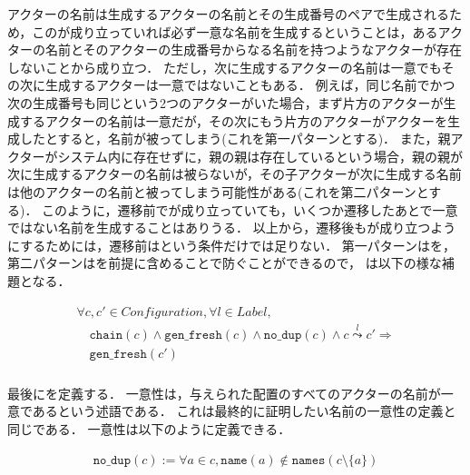 アクターの名前は生成するアクターの名前とその生成番号のペアで生成されるため，この\fresh が成り立っていれば必ず一意な名前を生成するということは，あるアクターの名前とそのアクターの生成番号からなる名前を持つようなアクターが存在しないことから成り立つ．
ただし，次に生成するアクターの名前は一意でもその次に生成するアクターは一意ではないこともある．
例えば，同じ名前でかつ次の生成番号も同じという2つのアクターがいた場合，まず片方のアクターが生成するアクターの名前は一意だが，その次にもう片方のアクターがアクターを生成したとすると，名前が被ってしまう(これを第一パターンとする)．
また，親アクターがシステム内に存在せずに，親の親は存在しているという場合，親の親が次に生成するアクターの名前は被らないが，その子アクターが次に生成する名前は他のアクターの名前と被ってしまう可能性がある(これを第二パターンとする)．
このように，遷移前で\fresh が成り立っていても，いくつか遷移したあとで一意ではない名前を生成することはありうる．
以上から，遷移後も\fresh が成り立つようにするためには，遷移前は\fresh という条件だけでは足りない．
第一パターンは\nodup を，第二パターンは\chain を前提に含めることで防ぐことができるので，
\freshpreserv は以下の様な補題となる．

\begin{lemma}{\freshpreserv}
\begin{displaymath}
  \begin{array}{l}
    \forall c, c' \in \textit{Configuration}, \forall l \in \textit{Label}, \\
    \quad \texttt{chain}(c) \wedge \texttt{gen\_fresh}(c) \wedge \texttt{no\_dup}(c) \wedge c \overset{l}{\leadsto} c' \Rightarrow \\
    \quad \texttt{gen\_fresh}(c')
  \end{array}
\end{displaymath}
\end{lemma}

\subsubsection{\nodup}

最後に\nodup を定義する．
一意性は，与えられた配置のすべてのアクターの名前が一意であるという述語である．
これは最終的に証明したい名前の一意性の定義と同じである．
一意性は以下のように定義できる．

\begin{definition}{\nodup}
\begin{displaymath}
  \begin{array}{l}
    \texttt{no\_dup}(c) :=
    \forall a \in c, \texttt{name}(a) \notin
    \texttt{names}(c \setminus \{a\})
  \end{array}
\end{displaymath}
\end{definition}

